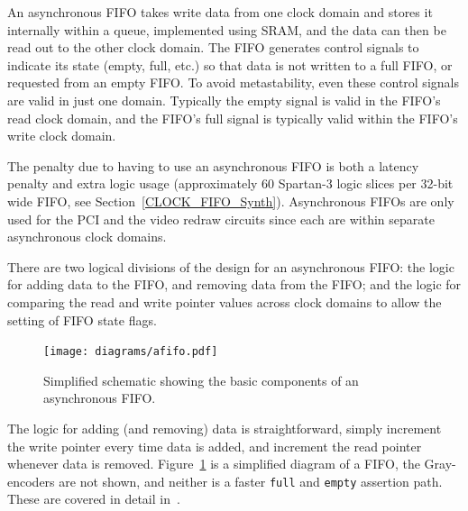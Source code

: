 
An asynchronous FIFO takes write data from one clock domain and stores it
internally within a queue, implemented using SRAM, and the data can then be read
out to the other clock domain. The FIFO generates control signals to indicate its
state (empty, full, etc.) so that data is not written to a full FIFO, or
requested from an empty FIFO. To avoid metastability, even these control signals
are valid in just one domain. Typically the empty signal is valid in the FIFO's
read clock domain, and the FIFO's full signal is typically valid within the
FIFO's write clock domain.

The penalty due to having to use an asynchronous FIFO is both a latency penalty
and extra logic usage (approximately 60 Spartan-3 logic slices per 32-bit wide
FIFO, see Section~\ref{CLOCK_FIFO_Synth}). Asynchronous FIFOs are only used for
the PCI and the video redraw circuits since each are within separate asynchronous
clock domains.

There are two logical divisions of the design for an asynchronous FIFO: the logic
for adding data to the FIFO, and removing data from the FIFO; and the logic for
comparing the read and write pointer values across clock domains to allow the
setting of FIFO state flags.

\begin{figure}[h!]
\begin{center}
\texttt{[image: diagrams/afifo.pdf]}
\caption[Simplified Asynchronous FIFO Schematic]{Simplified schematic showing
the basic components of an asynchronous FIFO.}
\label{FIFO_Logic}
\end{center}
\end{figure}

The logic for adding (and removing) data is straightforward, simply increment the
write pointer every time data is added, and increment the read pointer whenever
data is removed. Figure~\ref{FIFO_Logic} is a simplified diagram of a FIFO, the
Gray-encoders are not shown, and neither is a faster \texttt{full} and
\texttt{empty} assertion path. These are covered in detail in~\cite{Async_FIFO2}.


